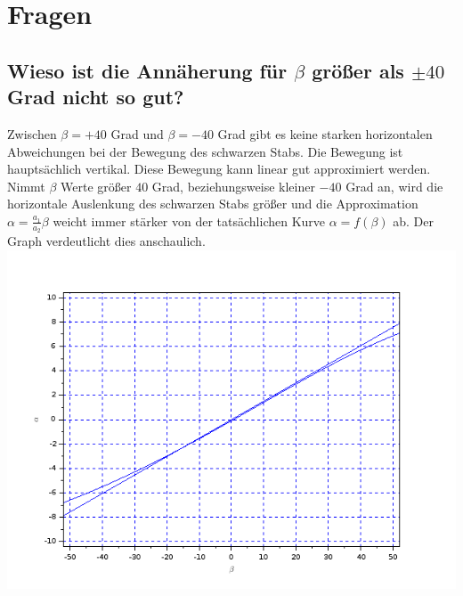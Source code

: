 \section{Fragen}
\subsection{Wieso ist die Annäherung für $\beta$ größer als $\pm40$ Grad nicht so gut?}
Zwischen $\beta=+40$ Grad und $\beta=-40$ Grad gibt es keine starken horizontalen Abweichungen bei der Bewegung des schwarzen Stabs. Die Bewegung ist hauptsächlich vertikal. Diese Bewegung kann linear gut approximiert werden. Nimmt $\beta$ Werte größer $40$ Grad, beziehungsweise kleiner $-40$ Grad an, wird die horizontale Auslenkung des schwarzen Stabs größer und die Approximation $\alpha=\frac{a_1}{a_2}\beta$ weicht immer stärker von der tatsächlichen Kurve $\alpha = f(\beta)$ ab. Der Graph verdeutlicht dies anschaulich.\\
\includegraphics[scale=0.5]{images/plot1.png}

